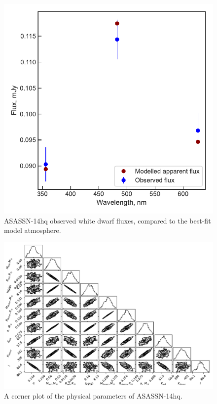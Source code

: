 \begin{figure}
    \centering
    \includegraphics[width=\textwidth]{figures/results/ASASSN-14hq/fluxplot.pdf}
    \caption{ASASSN-14hq observed white dwarf fluxes, compared to the best-fit model atmosphere.}
    \label{fig:ASASSN-14hq flux plot}
\end{figure}
\begin{figure}
    \includegraphics[height=\textwidth, angle=90]{figures/results/physicalparams_corners/ASASSN-14hq_physcorner.pdf}
    \caption{A corner plot of the physical parameters of ASASSN-14hq.}
\end{figure}
\clearpage



